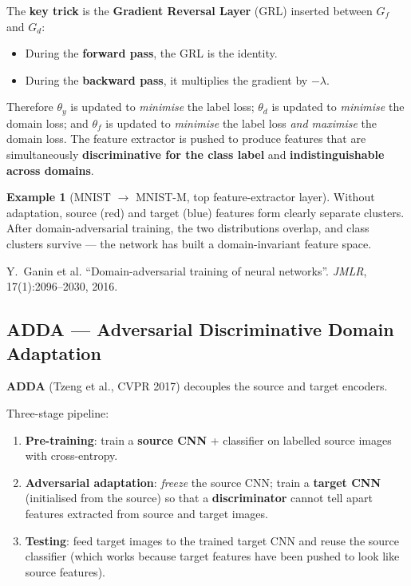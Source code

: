 \documentclass[11pt,a4paper]{article}
\theoremstyle{definition}
\newtheorem{example}{Example}[section]
\theoremstyle{plain}
\theoremstyle{remark}
\begin{document}
The \textbf{key trick} is the \textbf{Gradient Reversal Layer} (GRL) inserted between $G_f$ and $G_d$:
\begin{itemize}
    \item During the \textbf{forward pass}, the GRL is the identity.
    \item During the \textbf{backward pass}, it multiplies the gradient by $-\lambda$.
\end{itemize}
Therefore $\theta_y$ is updated to \emph{minimise} the label loss; $\theta_d$ is updated to \emph{minimise} the domain loss; and $\theta_f$ is updated to \emph{minimise} the label loss \emph{and maximise} the domain loss. The feature extractor is pushed to produce features that are simultaneously \textbf{discriminative for the class label} and \textbf{indistinguishable across domains}.

\begin{example}[MNIST $\to$ MNIST-M, top feature-extractor layer]
Without adaptation, source (red) and target (blue) features form clearly separate clusters. After domain-adversarial training, the two distributions overlap, and class clusters survive --- the network has built a domain-invariant feature space.
\end{example}

\begin{tcolorbox}[colback=blue!5!white,colframe=blue!60!black,title={Reference}]
Y.\ Ganin et al. ``Domain-adversarial training of neural networks''. \textit{JMLR}, 17(1):2096--2030, 2016.
\end{tcolorbox}

\subsection{ADDA --- Adversarial Discriminative Domain Adaptation}

\textbf{ADDA} (Tzeng et al., CVPR 2017) decouples the source and target encoders.

Three-stage pipeline:

\begin{enumerate}
    \item \textbf{Pre-training}: train a \textbf{source CNN} + classifier on labelled source images with cross-entropy.
    \item \textbf{Adversarial adaptation}: \emph{freeze} the source CNN; train a \textbf{target CNN} (initialised from the source) so that a \textbf{discriminator} cannot tell apart features extracted from source and target images.
    \item \textbf{Testing}: feed target images to the trained target CNN and reuse the source classifier (which works because target features have been pushed to look like source features).
\end{enumerate}
\end{document}
